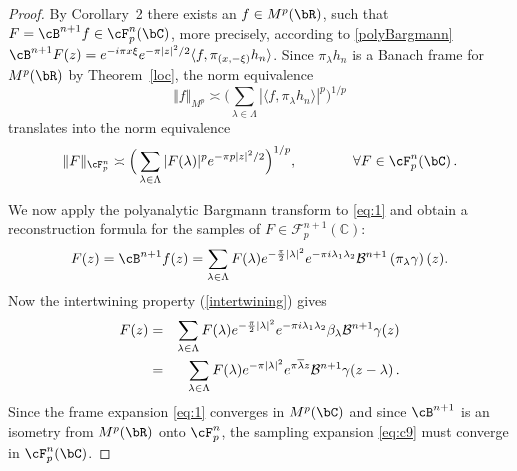 \documentclass[12pt]{amsart}
\theoremstyle{plain}
\numberwithin{equation}{section}
\begin{document}
\begin{proof}
By Corollary~2 there exists an $f\in M^{p}(\bR)$, such that $F=\cB^{n+1}f\in %
\cF_{p}^{n}(\bC)$, more precisely, according to \eqref{polyBargmann} $\cB%
^{n+1}F(z)=e^{-i\pi x\xi }e^{-\pi |z|^{2}/2}\langle f,\pi _{(x,-\xi
)}h_{n}\rangle $. Since $\pi _{\lambda }h_{n}$ is a Banach frame for $M^{p}(%
\bR)$ by Theorem~\ref{loc}, the norm equivalence 
\begin{equation*}
\Vert f\Vert _{M^{p}}\asymp \Big(\sum_{\lambda \in \Lambda }|\langle f,\pi
_{\lambda }h_{n}\rangle |^{p}\Big)^{1/p}
\end{equation*}%
translates into the norm equivalence 
\begin{equation*}
\Vert F\Vert _{\cF_{p}^{n}}\asymp \Big(\sum_{\lambda \in \Lambda }|F(\lambda
)|^{p}e^{-\pi p|z|^{2}/2}\Big)^{1/p},\qquad \qquad \forall F\in \cF_{p}^{n}(%
\bC)\,.
\end{equation*}

We now apply the polyanalytic Bargmann transform to \eqref{eq:1} and obtain
a reconstruction formula for the samples of $F\in \mathcal{F}^{n+1}_p(%
\mathbb{C}
)$: 
\begin{equation*}
F(z) = \cB ^{n+1}f(z) =\sum_{\lambda \in \Lambda }F(\lambda )e^{-\frac{\pi }{%
2}\left\vert \lambda \right\vert ^{2}}e^{-\pi i\lambda _{1}\lambda _{2}}%
\mathcal{B}^{n+1}\left( \pi _\lambda\gamma \right) (z).
\end{equation*}%
Now the intertwining property (\ref{intertwining}) gives 
\begin{eqnarray}
F(z)&=&\sum_{\lambda \in \Lambda }F(\lambda )e^{-\frac{\pi }{2}\left\vert
\lambda \right\vert ^{2}}e^{-\pi i\lambda _{1}\lambda _{2}}\beta _{\lambda }%
\mathcal{B}^{n+1} \gamma (z)  \notag \\
&=& \sum_{\lambda \in \Lambda }F(\lambda )e^{-\pi \left\vert \lambda
\right\vert ^{2}}e^{\pi \overline{\lambda }z}\mathcal{B}^{n+1} \gamma
(z-\lambda )\, .  \label{eq:c9}
\end{eqnarray}
Since the frame expansion \eqref{eq:1} converges in $M^p(\bC)$ and since $%
\cB ^{n+1}$ is an isometry from $M^p(\bR )$ onto $\cF ^n_p$, the sampling
expansion \eqref{eq:c9} must converge in $\cF ^n_p(\bC)$.


\end{proof}
\end{document}
